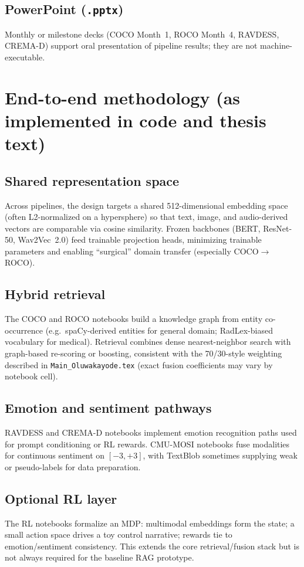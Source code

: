 \documentclass[11pt,a4paper]{article}
\begin{document}
\subsection{PowerPoint (\texttt{.pptx})}
Monthly or milestone decks (COCO Month~1, ROCO Month~4, RAVDESS, CREMA-D) support oral presentation of pipeline results; they are not machine-executable.

\section{End-to-end methodology (as implemented in code and thesis text)}

\subsection{Shared representation space}
Across pipelines, the design targets a shared 512-dimensional embedding space (often L2-normalized on a hypersphere) so that text, image, and audio-derived vectors are comparable via cosine similarity. Frozen backbones (BERT, ResNet-50, Wav2Vec~2.0) feed trainable projection heads, minimizing trainable parameters and enabling ``surgical'' domain transfer (especially COCO$\rightarrow$ROCO).

\subsection{Hybrid retrieval}
The COCO and ROCO notebooks build a knowledge graph from entity co-occurrence (e.g.\ spaCy-derived entities for general domain; RadLex-biased vocabulary for medical). Retrieval combines dense nearest-neighbor search with graph-based re-scoring or boosting, consistent with the 70/30-style weighting described in \texttt{Main\_Oluwakayode.tex} (exact fusion coefficients may vary by notebook cell).

\subsection{Emotion and sentiment pathways}
RAVDESS and CREMA-D notebooks implement emotion recognition paths used for prompt conditioning or RL rewards. CMU-MOSI notebooks fuse modalities for continuous sentiment on $[-3,+3]$, with TextBlob sometimes supplying weak or pseudo-labels for data preparation.

\subsection{Optional RL layer}
The RL notebooks formalize an MDP: multimodal embeddings form the state; a small action space drives a toy control narrative; rewards tie to emotion/sentiment consistency. This extends the core retrieval/fusion stack but is not always required for the baseline RAG prototype.
\end{document}
